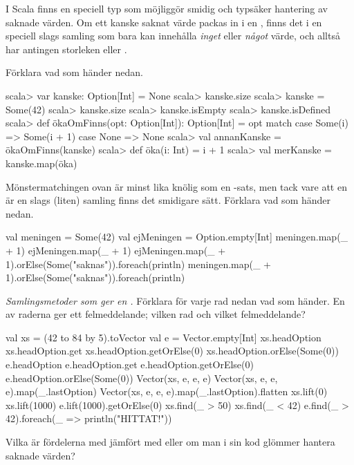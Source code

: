I Scala finns en speciell typ  som möjliggör smidig och typsäker hantering av saknade värden. Om ett kanske saknat värde packas in i en  , finns det i en speciell slags samling som bara kan innehålla \emph{inget} eller \emph{något} värde, och alltså har antingen storleken  eller .

\Subtask Förklara vad som händer nedan.
\begin{REPL}
scala> var kanske: Option[Int] = None
scala> kanske.size
scala> kanske = Some(42)
scala> kanske.size
scala> kanske.isEmpty
scala> kanske.isDefined
scala> def ökaOmFinns(opt: Option[Int]): Option[Int] = opt match {
         case Some(i) => Some(i + 1)
         case None    => None
       }
scala> val annanKanske = ökaOmFinns(kanske)
scala> def öka(i: Int) = i + 1
scala> val merKanske = kanske.map(öka)
\end{REPL}

\Subtask Mönstermatchingen ovan är minst lika knölig som en -sats, men tack vare att en  är en slags (liten) samling finns det smidigare sätt. Förklara vad som händer nedan.
\begin{REPL}
val meningen = Some(42)
val ejMeningen = Option.empty[Int]
meningen.map(_ + 1)
ejMeningen.map(_ + 1)
ejMeningen.map(_ + 1).orElse(Some("saknas")).foreach(println)
meningen.map(_ + 1).orElse(Some("saknas")).foreach(println)
\end{REPL}

\Subtask \emph{Samlingsmetoder som ger en .} Förklara för varje rad nedan vad som händer. En av raderna ger ett felmeddelande; vilken rad och vilket felmeddelande?
\begin{REPL}
val xs = (42 to 84 by 5).toVector
val e = Vector.empty[Int]
xs.headOption
xs.headOption.get
xs.headOption.getOrElse(0)
xs.headOption.orElse(Some(0))
e.headOption
e.headOption.get
e.headOption.getOrElse(0)
e.headOption.orElse(Some(0))
Vector(xs, e, e, e)
Vector(xs, e, e, e).map(_.lastOption)
Vector(xs, e, e, e).map(_.lastOption).flatten
xs.lift(0)
xs.lift(1000)
e.lift(1000).getOrElse(0)
xs.find(_ > 50)
xs.find(_ < 42)
e.find(_ > 42).foreach(_ => println("HITTAT!"))
\end{REPL}

\Subtask Vilka är fördelerna med  jämfört med  eller  om man i sin kod glömmer hantera saknade värden?

\SOLUTION


\TaskSolved \what


